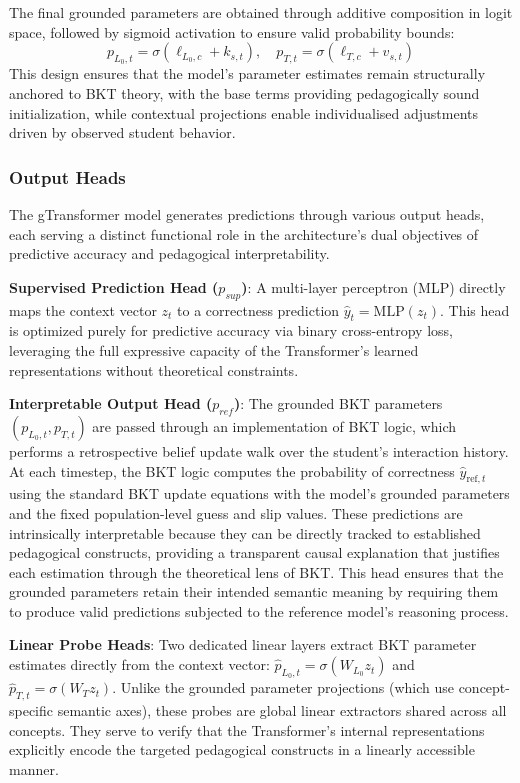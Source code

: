 \documentclass[applsci,article,submit,moreauthors,pdftex]{Definitions/mdpi}
\begin{document}
The final grounded parameters are obtained through additive composition in logit space, followed by sigmoid activation to ensure valid probability bounds:
\begin{equation} \label{eq:grounded_params}
    p_{L_0,t} = \sigma(\ell_{L_0,c} + k_{s,t}), \quad p_{T,t} = \sigma(\ell_{T,c} + v_{s,t})
\end{equation}
This design ensures that the model's parameter estimates remain structurally anchored to BKT theory, with the base terms providing pedagogically sound initialization, while contextual projections enable individualised adjustments driven by observed student behavior.

\subsubsection{Output Heads} \label{sec_output_heads}

The gTransformer model generates predictions through various output heads, each serving a distinct functional role in the architecture's dual objectives of predictive accuracy and pedagogical interpretability.

\textbf{Supervised Prediction Head ($p_{sup}$)}: A multi-layer perceptron (MLP) directly maps the context vector $z_t$ to a correctness prediction $\hat{y}_t = \text{MLP}(z_t)$. This head is optimized purely for predictive accuracy via binary cross-entropy loss, leveraging the full expressive capacity of the Transformer's learned representations without theoretical constraints.


\textbf{Interpretable Output Head ($p_{ref}$)}: The grounded BKT parameters $(p_{L_0,t}, p_{T,t})$ are passed through an implementation of BKT logic, which performs a retrospective belief update walk over the student's interaction history. At each timestep, the BKT logic computes the probability of correctness $\hat{y}_{\text{ref},t}$ using the standard BKT update equations with the model's grounded parameters and the fixed population-level guess and slip values. These predictions are intrinsically interpretable because they can be directly tracked to established pedagogical constructs, providing a transparent causal explanation that justifies each estimation through the theoretical lens of BKT. This head ensures that the grounded parameters retain their intended semantic meaning by requiring them to produce valid predictions subjected to the reference model's reasoning process.

\textbf{Linear Probe Heads}: Two dedicated linear layers extract BKT parameter estimates directly from the context vector: $\hat{p}_{L_0,t} = \sigma(W_{L_0} z_t)$ and $\hat{p}_{T,t} = \sigma(W_{T} z_t)$. Unlike the grounded parameter projections (which use concept-specific semantic axes), these probes are global linear extractors shared across all concepts. They serve to verify that the Transformer's internal representations explicitly encode the targeted pedagogical constructs in a linearly accessible manner.
\end{document}

